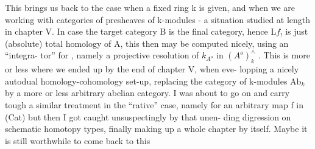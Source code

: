 This brings us back to the case when a fixed ring k is given,
and when we are working with categories of presheaves of k-modules
- a situation studied at length in chapter V. In case the target
category B is the final category, hence L$f_{!}$ is just (absolute) total
homology of A, this then may be computed nicely, using an ``integra-%
tor'' for  , namely a projective resolution of $k_{A^o}$ in $(A^o)^{\wedge}_{k}$ . This
is more or less where we ended up  by the end of chapter V, when eve-%
 lopping a nicely autodual homology-cohomology set-up, 
replacing the category of k-modules $\mathrm{Ab}_k$ by a more or less arbitrary
abelian category. I was about to  go on and carry tough
a similar treatment in the ``rative'' case, namely for an arbitrary
map f in (Cat) \deleted{\unsure{,}}\hand{(}but then I got caught unsuspectingly by that unen-%
ding digression on schematic homotopy types, finally making up a whole
chapter by itself\hand{)}. Maybe it is still worthwhile to come back to this\hand{,}


